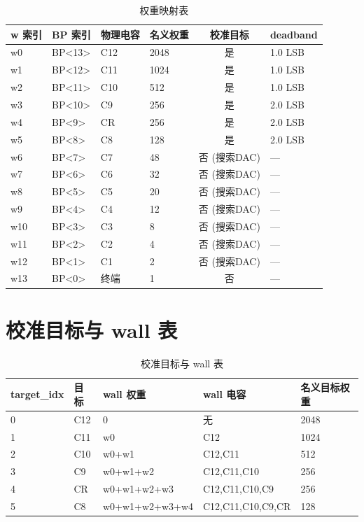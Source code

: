 \documentclass[UTF8,a4paper,11pt]{ctexart}
\begin{document}
\begin{table}[H]
\centering
\caption{权重映射表}
\label{tab:app-weight-mapping}
\small
\begin{tabular}{llllcl}
\toprule
w 索引 & BP 索引 & 物理电容 & 名义权重 & 校准目标 & deadband \\
\midrule
w0  & BP<13> & C12 & 2048 & 是 & 1.0 LSB \\
w1  & BP<12> & C11 & 1024 & 是 & 1.0 LSB \\
w2  & BP<11> & C10 & 512  & 是 & 1.0 LSB \\
w3  & BP<10> & C9  & 256  & 是 & 2.0 LSB \\
w4  & BP<9>  & CR  & 256  & 是 & 2.0 LSB \\
w5  & BP<8>  & C8  & 128  & 是 & 2.0 LSB \\
w6  & BP<7>  & C7  & 48   & 否 (搜索DAC) & --- \\
w7  & BP<6>  & C6  & 32   & 否 (搜索DAC) & --- \\
w8  & BP<5>  & C5  & 20   & 否 (搜索DAC) & --- \\
w9  & BP<4>  & C4  & 12   & 否 (搜索DAC) & --- \\
w10 & BP<3>  & C3  & 8    & 否 (搜索DAC) & --- \\
w11 & BP<2>  & C2  & 4    & 否 (搜索DAC) & --- \\
w12 & BP<1>  & C1  & 2    & 否 (搜索DAC) & --- \\
w13 & BP<0>  & 终端 & 1   & 否 & --- \\
\bottomrule
\end{tabular}
\end{table}

\section{校准目标与 wall 表}
\label{app:cal-target-wall}

\begin{table}[H]
\centering
\caption{校准目标与 wall 表}
\label{tab:app-cal-target-wall}
\begin{tabular}{lllll}
\toprule
target\_idx & 目标 & wall 权重 & wall 电容 & 名义目标权重 \\
\midrule
0 & C12 & 0                   & 无                    & 2048 \\
1 & C11 & w0                  & C12                   & 1024 \\
2 & C10 & w0+w1               & C12,C11               & 512  \\
3 & C9  & w0+w1+w2            & C12,C11,C10           & 256  \\
4 & CR  & w0+w1+w2+w3         & C12,C11,C10,C9        & 256  \\
5 & C8  & w0+w1+w2+w3+w4      & C12,C11,C10,C9,CR     & 128  \\
\bottomrule
\end{tabular}
\end{table}
\end{document}
